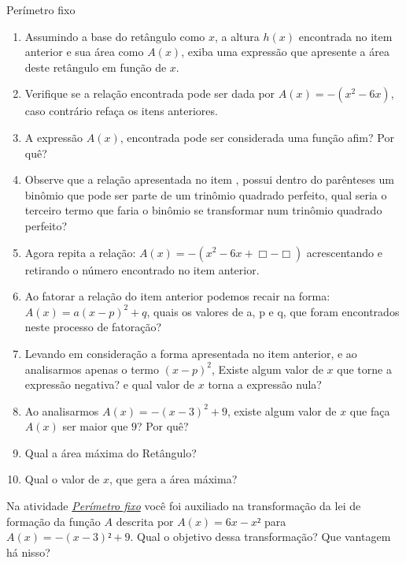 \begin{task}{Perímetro fixo}
\begin{enumerate}
\item {} 
Assumindo a base do retângulo como \(x\), a altura \(h(x)\) encontrada no item anterior e sua área como \(A(x)\), exiba uma expressão que apresente a área deste retângulo em função de \(x\).

\item {} 
Verifique se a relação encontrada pode ser dada por \(A(x)=-(x^2-6x)\), caso contrário refaça os itens anteriores.

\item {} 
A expressão \(A(x)\), encontrada pode ser considerada uma função afim? Por quê?

\item {} 
Observe que a relação apresentada no item , possui dentro do parênteses um binômio que pode ser parte de um trinômio quadrado perfeito, qual seria o terceiro termo que faria o binômio se transformar num trinômio quadrado perfeito?

\item {} 
Agora repita a relação: \(A(x)=-(x^2-6x+\Box -\Box)\) acrescentando e retirando o número encontrado no item anterior.

\item {} 
Ao fatorar a relação do item anterior podemos recair na forma: \(A(x)=a(x-p)^2+q\), quais os valores de a, p e q, que foram encontrados neste processo de fatoração?

\item {} 
Levando em consideração a forma apresentada no item anterior, e ao analisarmos apenas o termo \((x-p)^2\), Existe algum valor de \(x\) que torne a expressão negativa? e qual valor de \(x\) torna a expressão nula?

\item {} 
Ao analisarmos \(A(x)=-(x-3)^2+9\), existe algum valor de \(x\) que faça \(A(x)\) ser maior que \(9\)? Por quê?

\item {} 
Qual a área máxima do Retângulo?

\item {} 
Qual o valor de \(x\), que gera a área máxima?

\end{enumerate}
\end{task}

\label{\detokenize{AF209-3:sec-funcao-quadratica-org-ideias-quad-max-min-na-quadratica}}\label{\detokenize{AF209-3:organizando-as-ideias-maximos-ou-minimos}}
Na atividade \hyperref[\detokenize{AF209-3:sub-ativ-funcao-quadratica-perimetro-fixo}]{\textit{Perímetro fixo}} você foi auxiliado na transformação da lei de formação da função \(A\) descrita por \(A(x)=6x-x²\) para \(A(x)=-(x-3)²+9\). Qual o objetivo dessa transformação? Que vantagem há nisso?

